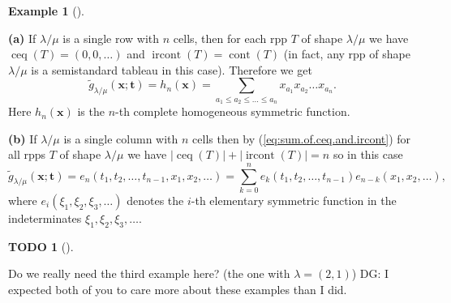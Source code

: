 \documentclass[numbers=enddot,12pt,final,onecolumn,notitlepage]{scrartcl}%
\theoremstyle{definition}
\newtheorem{quest}[theo]{TODO}
\newenvironment{todo}[1][]
{\begin{quest}[#1]\begin{leftbar}}
{\end{leftbar}\end{quest}}
\newtheorem{exmp}[theo]{Example}
\newenvironment{example}[1][]
{\begin{exmp}[#1]\begin{leftbar}}
{\end{leftbar}\end{exmp}}
\let\sumnonlimits\sum
\renewcommand{\sum}{\sumnonlimits\limits}
\def\ceq{{\operatorname*{ceq}}}
\def\ircont{{\operatorname*{ircont}}}
\def\cont{{\operatorname*{cont}}}
\def\g{{\widetilde{g}}}
\def\t{{\mathbf{t}}}
\def\x{{\mathbf{x}}}
\def\lm{{\lambda/\mu}}
\begin{document}
\begin{example}
\label{exa.gtilde.1}
\textbf{(a)} If $\lm$ is a single row with $n$ cells, then for each rpp $T$ of shape $\lm$ we have $\ceq(T)=(0,0,\dots)$ and $\ircont(T)=\cont(T)$ (in fact, any rpp of shape $\lm$ is a semistandard tableau in this case). Therefore we get 
\[
\g_\lm(\x;\t)=h_n(\x)=\sum_{a_1\leq a_2\leq\dots\leq a_n} x_{a_1}x_{a_2}\dots x_{a_n}.
\]
 Here $h_n(\x)$ is the $n$-th complete homogeneous symmetric function.




\textbf{(b)} If $\lm$ is a single column with $n$ cells then by (\ref{eq:sum.of.ceq.and.ircont}) for all rpps $T$ of shape $\lm$ we have $|\ceq(T)|+|\ircont(T)|=n$ so in this case 
\[
\g_\lm(\x;\t)=e_n(t_1,t_2,\dots,t_{n-1},x_1,x_2,\dots)=\sum_{k=0}^{n}e_{k}\left(  t_{1},t_{2},\ldots,t_{n-1}\right)
e_{n-k}\left(  x_{1},x_{2},\ldots\right),
\]
where $e_{i}\left(  \xi_{1},\xi_{2},\xi_{3},\ldots\right)  $ denotes the
$i$-th elementary symmetric function in the indeterminates $\xi_{1},\xi
_{2},\xi_{3},\ldots$. 


\begin{todo}
 Do we really need the third example here? (the one with $\lambda=(2,1)$)
 DG: I expected both of you to care more about these examples than I did.
\end{todo}


\end{example}
\end{document}
